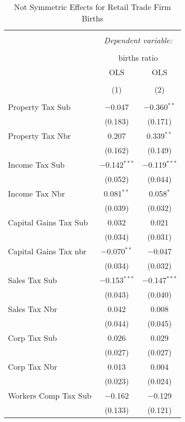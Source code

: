 
\begin{table}[!htbp] \centering 
  \caption{Not Symmetric Effects for  Retail Trade Firm Births} 
  \label{} 
\begin{tabular}{@{\extracolsep{5pt}}lcc} 
\\[-1.8ex]\hline 
\hline \\[-1.8ex] 
 & \multicolumn{2}{c}{\textit{Dependent variable:}} \\ 
\cline{2-3} 
\\[-1.8ex] & \multicolumn{2}{c}{births ratio} \\ 
 & OLS & OLS \\ 
\\[-1.8ex] & (1) & (2)\\ 
\hline \\[-1.8ex] 
 Property Tax Sub & $-$0.047 & $-$0.360$^{**}$ \\ 
  & (0.183) & (0.171) \\ 
  Property Tax Nbr & 0.207 & 0.339$^{**}$ \\ 
  & (0.162) & (0.149) \\ 
  Income Tax Sub & $-$0.142$^{***}$ & $-$0.119$^{***}$ \\ 
  & (0.052) & (0.044) \\ 
  Income Tax Nbr & 0.081$^{**}$ & 0.058$^{*}$ \\ 
  & (0.039) & (0.032) \\ 
  Capital Gains Tax Sub & 0.032 & 0.021 \\ 
  & (0.034) & (0.031) \\ 
  Capital Gains Tax nbr & $-$0.070$^{**}$ & $-$0.047 \\ 
  & (0.034) & (0.032) \\ 
  Sales Tax Sub & $-$0.153$^{***}$ & $-$0.147$^{***}$ \\ 
  & (0.043) & (0.040) \\ 
  Sales Tax Nbr & 0.042 & 0.008 \\ 
  & (0.044) & (0.045) \\ 
  Corp Tax Sub & 0.026 & 0.029 \\ 
  & (0.027) & (0.027) \\ 
  Corp Tax Nbr & 0.013 & 0.004 \\ 
  & (0.023) & (0.024) \\ 
  Workers Comp Tax Sub & $-$0.162 & $-$0.129 \\ 
  & (0.133) & (0.121) \\ 

\end{tabular}
\end{table}
